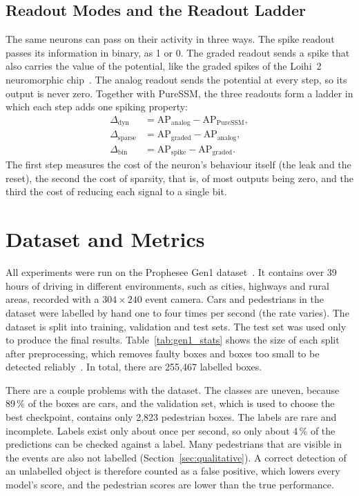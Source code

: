 \documentclass[11pt, a4paper]{report}
\begin{document}
\subsection{Readout Modes and the Readout Ladder}
\label{subsec:readout_modes}
The same neurons can pass on their activity in three ways. The spike readout passes its
information in binary, as 1 or 0. The graded readout sends a spike that also carries the value of
the potential, like the graded spikes of the Loihi~2 neuromorphic chip~\cite{orchard2021efficient}. The
analog readout sends the potential at every step, so its output is never zero. Together with PureSSM,
the three readouts form a ladder in which each step adds one spiking property:
\begin{equation}
\begin{aligned}
  \Delta_{\mathrm{dyn}} &= \mathrm{AP}_{\mathrm{analog}} - \mathrm{AP}_{\mathrm{PureSSM}},\\
  \Delta_{\mathrm{sparse}} &= \mathrm{AP}_{\mathrm{graded}} - \mathrm{AP}_{\mathrm{analog}},\\
  \Delta_{\mathrm{bin}} &= \mathrm{AP}_{\mathrm{spike}} - \mathrm{AP}_{\mathrm{graded}}.
\end{aligned}
  \label{eq:ladder}
\end{equation}
The first step measures the cost of the neuron's behaviour itself (the leak and the reset), the second the cost of sparsity, that is, of most outputs being zero, and the third the cost of reducing each signal to a single bit.
\newpage
\section{Dataset and Metrics}
\label{sec:dataset}
All experiments were run on the Prophesee Gen1 dataset~\cite{detournemire2020large}. It contains over 39
hours of driving in different environments, such as cities, highways and rural areas, recorded with a
$304\times240$ event camera. Cars and pedestrians in the dataset were labelled by hand one to four times per
second (the rate varies). The dataset is split into training, validation and test sets. The test set
was used only to produce the final results. Table~\ref{tab:gen1_stats} shows the size of each split after
preprocessing, which removes faulty boxes and boxes too small to be detected
reliably~\cite{gehrig2023recurrent}. In total, there are 255{,}467 labelled boxes.

There are a couple problems with the dataset. The classes are uneven, because 89\,\% of the boxes are
cars, and the validation set, which is used to choose the best checkpoint, contains only 2{,}823 pedestrian
boxes. The labels are rare and incomplete. Labels exist only about once per second, so only
about 4\,\% of the predictions can be checked against a label. Many pedestrians that are visible in the
events are also not labelled (Section~\ref{sec:qualitative}). A correct detection of an unlabelled object
is therefore counted as a false positive, which lowers every model's score, and the pedestrian scores are
lower than the true performance.
\end{document}
